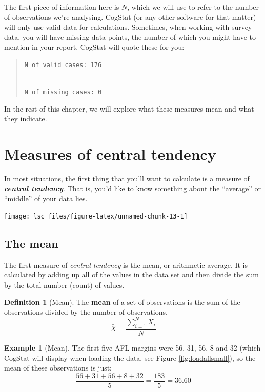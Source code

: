 \documentclass[
]{book}
\theoremstyle{definition}
\newtheorem{definition}{Definition}[chapter]
\theoremstyle{definition}
\newtheorem{example}{Example}[chapter]
\theoremstyle{definition}
\theoremstyle{definition}
\theoremstyle{remark}
\begin{document}
The first piece of information here is \(N\), which we will use to refer to the number of observations we're analysing. CogStat (or any other software for that matter) will only use valid data for calculations. Sometimes, when working with survey data, you will have missing data points, the number of which you might have to mention in your report. CogStat will quote these for you:

\begin{quote}
\texttt{N\ of\ valid\ cases:\ 176}\strut \\
\texttt{N\ of\ missing\ cases:\ 0}
\end{quote}

In the rest of this chapter, we will explore what these measures mean and what they indicate.

\hypertarget{centraltendency}{%
\section{Measures of central tendency}\label{centraltendency}}

In most situations, the first thing that you'll want to calculate is a measure of \textbf{\emph{central tendency}}. That is, you'd like to know something about the ``average'' or ``middle'' of your data lies.

\begin{center}\texttt{[image: lsc\_files/figure-latex/unnamed-chunk-13-1]} \end{center}

\hypertarget{mean}{%
\subsection{The mean}\label{mean}}

The first measure of \emph{central tendency} is the mean, or arithmetic average. It is calculated by adding up all of the values in the data set and then divide the sum by the total number (count) of values.

\begin{definition}[Mean]
\protect\hypertarget{def:defmean}{}\label{def:defmean}The \textbf{mean} of a set of observations is the sum of the observations divided by the number of observations.
\[
\bar{X} = \frac{\sum_{i=1}^N X_i}{N}
\]
\end{definition}

\begin{example}[Mean]
\protect\hypertarget{exm:exmean}{}\label{exm:exmean}The first five AFL margins were 56, 31, 56, 8 and 32 (which CogStat will display when loading the data, see Figure \ref{fig:loadaflsmall}), so the mean of these observations is just:
\[
\frac{56 + 31 + 56 + 8 + 32}{5} = \frac{183}{5} = 36.60
\]
\end{example}
\end{document}
